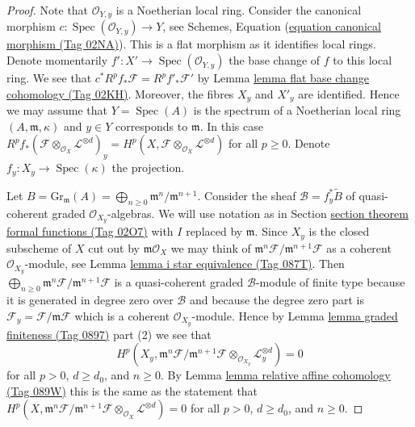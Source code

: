 \documentclass{amsart}
\theoremstyle{plain}
\theoremstyle{definition}
\theoremstyle{remark}
\numberwithin{equation}{subsection}
\def\Spec{\mathop{\mathrm{Spec}}}
\begin{document}
\begin{proof}
Note that $\mathcal{O}_{Y, y}$ is a Noetherian local ring.
Consider the canonical morphism
$c : \Spec(\mathcal{O}_{Y, y}) \to Y$, see
Schemes, Equation (\href{https://stacks.math.columbia.edu/tag/02NA}{equation canonical morphism (Tag 02NA)}).
This is a flat morphism as it identifies local rings.
Denote momentarily $f' : X' \to \Spec(\mathcal{O}_{Y, y})$
the base change of $f$ to this local ring. We see that
$c^*R^pf_*\mathcal{F} = R^pf'_*\mathcal{F}'$ by
Lemma \href{https://stacks.math.columbia.edu/tag/02KH}{lemma flat base change cohomology (Tag 02KH)}.
Moreover, the fibres $X_y$ and $X'_y$ are identified.
Hence we may assume that $Y = \Spec(A)$ is the spectrum of
a Noetherian local ring $(A, \mathfrak m, \kappa)$ and $y \in Y$
corresponds to $\mathfrak m$. In this case
$R^pf_*(\mathcal{F} \otimes_{\mathcal{O}_X} \mathcal{L}^{\otimes d})_y =
H^p(X, \mathcal{F} \otimes_{\mathcal{O}_X} \mathcal{L}^{\otimes d})$
for all $p \geq 0$. Denote $f_y : X_y \to \Spec(\kappa)$ the projection.

\medskip\noindent
Let $B = \text{Gr}_\mathfrak m(A) =
\bigoplus_{n \geq 0} \mathfrak m^n/\mathfrak m^{n + 1}$.
Consider the sheaf $\mathcal{B} = f_y^*\widetilde{B}$
of quasi-coherent graded $\mathcal{O}_{X_y}$-algebras.
We will use notation as in Section \href{https://stacks.math.columbia.edu/tag/02O7}{section theorem formal functions (Tag 02O7)}
with $I$ replaced by $\mathfrak m$.
Since $X_y$ is the closed subscheme of $X$ cut out by
$\mathfrak m\mathcal{O}_X$ we may think of
$\mathfrak m^n\mathcal{F}/\mathfrak m^{n + 1}\mathcal{F}$
as a coherent $\mathcal{O}_{X_y}$-module, see
Lemma \href{https://stacks.math.columbia.edu/tag/087T}{lemma i star equivalence (Tag 087T)}. Then
$\bigoplus_{n \geq 0} \mathfrak m^n\mathcal{F}/\mathfrak m^{n + 1}\mathcal{F}$
is a quasi-coherent graded $\mathcal{B}$-module of finite type
because it is generated in degree zero over $\mathcal{B}$
and because the degree zero part is
$\mathcal{F}_y = \mathcal{F}/\mathfrak m \mathcal{F}$
which is a coherent $\mathcal{O}_{X_y}$-module.
Hence by Lemma \href{https://stacks.math.columbia.edu/tag/0897}{lemma graded finiteness (Tag 0897)} part (2)
we see that
$$
H^p(X_y, \mathfrak m^n \mathcal{F}/ \mathfrak m^{n + 1}\mathcal{F}
\otimes_{\mathcal{O}_{X_y}} \mathcal{L}_y^{\otimes d}) = 0
$$
for all $p > 0$, $d \geq d_0$, and $n \geq 0$. By
Lemma \href{https://stacks.math.columbia.edu/tag/089W}{lemma relative affine cohomology (Tag 089W)}
this is the same as the statement that
$
H^p(X, \mathfrak m^n \mathcal{F}/ \mathfrak m^{n + 1}\mathcal{F}
\otimes_{\mathcal{O}_X} \mathcal{L}^{\otimes d}) = 0
$
for all $p > 0$, $d \geq d_0$, and $n \geq 0$.


\end{proof}
\end{document}
